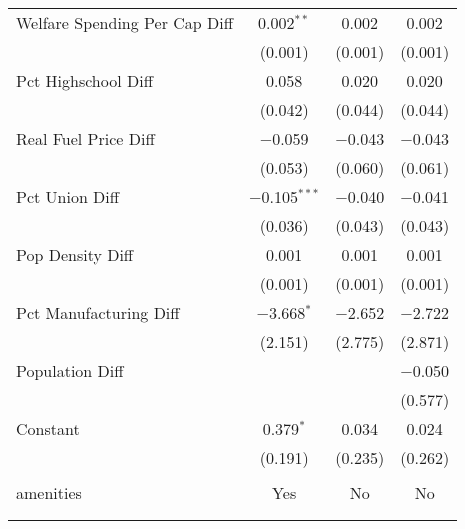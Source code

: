\begin{table}[!htbp]
\begin{tabular}{@{\extracolsep{5pt}}lccc}
  Welfare Spending Per Cap Diff & 0.002$^{**}$ & 0.002 & 0.002 \\ 
  & (0.001) & (0.001) & (0.001) \\ 
  Pct Highschool Diff & 0.058 & 0.020 & 0.020 \\ 
  & (0.042) & (0.044) & (0.044) \\ 
  Real Fuel Price Diff & $-$0.059 & $-$0.043 & $-$0.043 \\ 
  & (0.053) & (0.060) & (0.061) \\ 
  Pct Union Diff & $-$0.105$^{***}$ & $-$0.040 & $-$0.041 \\ 
  & (0.036) & (0.043) & (0.043) \\ 
  Pop Density Diff & 0.001 & 0.001 & 0.001 \\ 
  & (0.001) & (0.001) & (0.001) \\ 
  Pct Manufacturing Diff & $-$3.668$^{*}$ & $-$2.652 & $-$2.722 \\ 
  & (2.151) & (2.775) & (2.871) \\ 
  Population Diff &  &  & $-$0.050 \\ 
  &  &  & (0.577) \\ 
  Constant & 0.379$^{*}$ & 0.034 & 0.024 \\ 
  & (0.191) & (0.235) & (0.262) \\ 
 \hline \\[-1.8ex] 
amenities & Yes & No & No \\ 
\hline \\[-1.8ex] 
\hline 
\hline \\[-1.8ex] 
\end{tabular} 
\end{table} 
